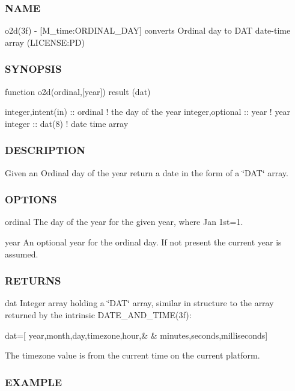 \subsubsection*{N\+A\+ME}

o2d(3f) -\/ \mbox{[}M\+\_\+time\+:O\+R\+D\+I\+N\+A\+L\+\_\+\+D\+AY\mbox{]} converts Ordinal day to D\+AT date-\/time array (L\+I\+C\+E\+N\+SE\+:PD) 

\subsubsection*{S\+Y\+N\+O\+P\+S\+IS}

\begin{DoxyVerb}function o2d(ordinal,[year]) result (dat)

 integer,intent(in) :: ordinal  ! the day of the year
 integer,optional   :: year     ! year
 integer            :: dat(8)   ! date time array
\end{DoxyVerb}


\subsubsection*{D\+E\+S\+C\+R\+I\+P\+T\+I\+ON}

Given an Ordinal day of the year return a date in the form of a \char`\"{}\+D\+A\+T\char`\"{} array.

\subsubsection*{O\+P\+T\+I\+O\+NS}

ordinal The day of the year for the given year, where Jan 1st=1.

year An optional year for the ordinal day. If not present the current year is assumed.

\subsubsection*{R\+E\+T\+U\+R\+NS}

dat Integer array holding a \char`\"{}\+D\+A\+T\char`\"{} array, similar in structure to the array returned by the intrinsic D\+A\+T\+E\+\_\+\+A\+N\+D\+\_\+\+T\+I\+M\+E(3f)\+:

dat=\mbox{[} year,month,day,timezone,hour,\& \& minutes,seconds,milliseconds\mbox{]}

The timezone value is from the current time on the current platform.

\subsubsection*{E\+X\+A\+M\+P\+LE}

